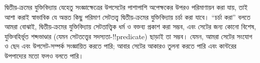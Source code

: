 \documentclass[../../../include/open-logic-section]{subfiles}
\begin{document}


দ্বিতীয়-ক্রমের যুক্তিবিদ্যায় যেহেতু সংজ্ঞাক্ষেত্রের উপসেটের পাশাপাশি
অপেক্ষকের উপরও পরিমাণায়ন করা যায়, তাই আশা করাই স্বাভাবিক যে অন্তত কিছু
পরিমাণ সেটতত্ত্ব দ্বিতীয়-ক্রমের যুক্তিবিদ্যায় চর্চা করা যাবে। ``চর্চা
করা'' বলতে আমরা বোঝাই, দ্বিতীয়-ক্রমের যুক্তিবিদ্যায় সেটতাত্ত্বিক ধর্ম ও
বক্তব্য প্রকাশ করা সম্ভব, এবং সেটের জন্য কোনো বিশেষ, যুক্তিবহির্ভূত শব্দভাণ্ডার
(যেমন সেটতত্ত্বের সদস্যতা-!!{predicate}) ছাড়াই তা সম্ভব। যেমন, আমরা সেটের
সংযোগ ও ছেদ এবং উপসেট-সম্পর্ক সংজ্ঞায়িত করতে পারি; আবার সেটের আকারও তুলনা
করতে পারি এবং কান্টরের উপপাদ্যের মতো ফলও বলতে পারি।
\end{document}
